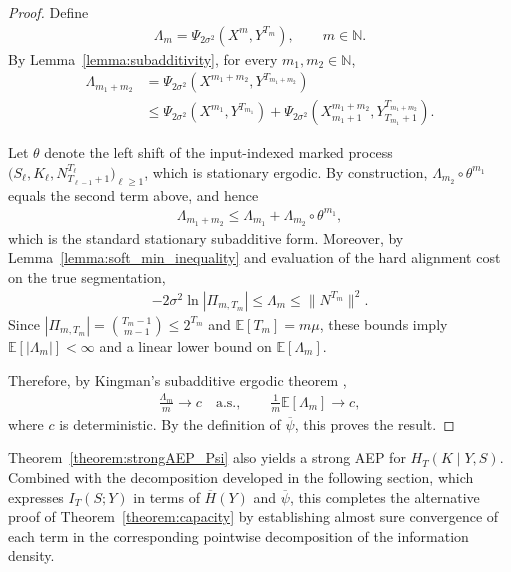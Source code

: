 \documentclass[onecolumn]{IEEEtran}
\theoremstyle{definition}
\begin{document}
\begin{proof}
Define
\begin{align*}
\Lambda_m =\Psi_{2\sigma^2}(X^m,Y^{T_m}), \qquad m\in\mathbb{N}.
\end{align*}
By Lemma~\ref{lemma:subadditivity}, for every \(m_1,m_2\in\mathbb{N}\),
\begin{align*}
\Lambda_{m_1+m_2}
&=
\Psi_{2\sigma^2}(X^{m_1+m_2},Y^{T_{m_1+m_2}}) \\
&\le
\Psi_{2\sigma^2}(X^{m_1},Y^{T_{m_1}})
+
\Psi_{2\sigma^2}(X_{m_1+1}^{m_1+m_2},
Y_{T_{m_1}+1}^{T_{m_1+m_2}}).
\end{align*}

{
Let $\theta$ denote the left shift of the input-indexed marked process
$\bigl(S_\ell,K_\ell,N_{T_{\ell-1}+1}^{T_\ell}\bigr)_{\ell\geq1}$,
which is stationary ergodic. By construction,
$\Lambda_{m_2} \circ \theta^{m_1}$ equals the second term above, and hence
}
\begin{align*}
{
\Lambda_{m_1+m_2}
\leq
\Lambda_{m_1}
+
\Lambda_{m_2}\circ\theta^{m_1},
}
\end{align*}
{
which is the standard stationary subadditive form. Moreover, by
Lemma~\ref{lemma:soft_min_inequality} and evaluation of the hard
alignment cost on the true segmentation,
}
\begin{align*}
{
-2\sigma^2\ln|\Pi_{m,T_m}|
\leq \Lambda_m
\leq \|N^{T_m}\|^2 .
}
\end{align*}
{
Since $|\Pi_{m,T_m}|=\binom{T_m-1}{m-1}\leq2^{T_m}$ and
$\mathbb{E}[T_m]=m\mu$, these bounds imply
$\mathbb{E}[|\Lambda_m|]<\infty$ and a linear lower bound on
$\mathbb{E}[\Lambda_m]$.
}

Therefore, by Kingman's subadditive ergodic theorem \cite{Kingman1968},
\begin{align*}
\frac{\Lambda_m}{m}\to c \quad \text{a.s.},
\qquad
\frac{1}{m}\mathbb{E}[\Lambda_m]\to c,
\end{align*}
where \(c\) is deterministic. By the definition of \(\overline{\psi}\), this proves the result.
\end{proof}


Theorem~\ref{theorem:strongAEP_Psi} also yields a strong AEP for
\(H_T(K\mid Y,S)\). Combined with the decomposition developed in the
following section, which expresses \(I_T(S;Y)\) in terms of
\(\overline{H}(Y)\) and \(\overline{\psi}\), this completes the
alternative proof of Theorem~\ref{theorem:capacity} {
by establishing almost sure convergence of each term in the
corresponding pointwise decomposition of the information density}.
\end{document}
